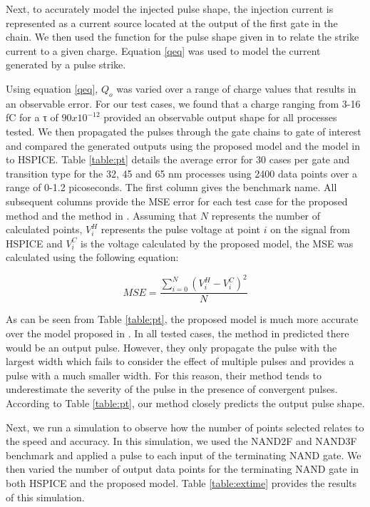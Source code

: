Next, to accurately model the injected pulse shape, the injection current is represented as a current source located at the output of the first gate in the chain. We then used the function for the pulse shape given in \cite{injeq} to relate the strike current to a given charge. Equation \ref{qeq} was used to model the current generated by a pulse strike.

Using equation \ref{qeq}, $Q_o$ was varied over a range of charge values that results in an observable error. For our test cases, we found that a charge ranging from 3-16 fC for a τ of $90x10^{-12}$ provided an observable output shape for all processes tested. We then propagated the pulses through the gate chains to gate of interest and compared the generated outputs using the proposed model and the model in \cite{Accurate_Masking} to HSPICE. Table \ref{table:pt} details the average error for 30 cases per gate and transition type for the 32, 45 and 65 nm processes using 2400 data points over a range of 0-1.2 picoseconds. The first column gives the benchmark name. All subsequent columns provide the MSE error for each test case for the proposed method and the method in \cite{Accurate_Masking}. Assuming that $N$ represents the number of calculated points, $V_i^H$ represents the pulse voltage at point $i$ on the signal from HSPICE and $V_i^C$ is the voltage calculated by the proposed model, the MSE was calculated using the following equation:

\begin{equation}
MSE = \frac{\sum_{i=0}^{N} (V_i^H - V_i^C)^2}{N}
\end{equation}

As can be seen from Table \ref{table:pt}, the proposed model is much more accurate over the model proposed in \cite{Accurate_Masking}. In all tested cases, the method in \cite{Accurate_Masking} predicted there would be an output pulse. However, they only propagate the pulse with the largest width which fails to consider the effect of multiple pulses and provides a pulse with a much smaller width. For this reason, their method tends to underestimate the severity of the pulse in the presence of convergent pulses. According to Table \ref{table:pt}, our method closely predicts the output pulse shape.

Next, we run a simulation to observe how the number of points selected relates to the speed and accuracy. In this simulation, we used the NAND2F and NAND3F benchmark and applied a pulse to each input of the terminating NAND gate. We then varied the number of output data points for the terminating NAND gate in both HSPICE and the proposed model. Table \ref{table:extime} provides the results of this simulation.

